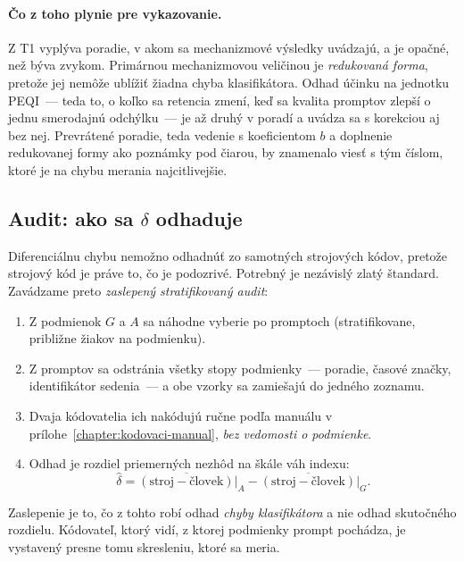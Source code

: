 \paragraph{Čo z toho plynie pre vykazovanie.} Z T1 vyplýva poradie, v akom sa mechanizmové výsledky uvádzajú, a je opačné, než býva zvykom. Primárnou mechanizmovou veličinou je \emph{redukovaná forma}, pretože jej nemôže ublížiť žiadna chyba klasifikátora. Odhad účinku na jednotku PEQI~--- teda to, o koľko sa retencia zmení, keď sa kvalita promptov zlepší o jednu smerodajnú odchýlku~--- je až druhý v poradí a uvádza sa s korekciou aj bez nej. Prevrátené poradie, teda vedenie s koeficientom $b$ a doplnenie redukovanej formy ako poznámky pod čiarou, by znamenalo viesť s tým číslom, ktoré je na chybu merania najcitlivejšie.

\subsection{Audit: ako sa \texorpdfstring{$\delta$}{delta} odhaduje}
\label{sec:audit}

Diferenciálnu chybu nemožno odhadnúť zo samotných strojových kódov, pretože strojový kód je práve to, čo je podozrivé. Potrebný je nezávislý zlatý štandard. Zavádzame preto \emph{zaslepený stratifikovaný audit}:

\begin{enumerate}[nosep]
    \item Z podmienok $G$ a $A$ sa náhodne vyberie po \audN{} promptoch (stratifikovane, približne \audPupils{} žiakov na podmienku).
    \item Z promptov sa odstránia všetky stopy podmienky~--- poradie, časové značky, identifikátor sedenia~--- a obe vzorky sa zamiešajú do jedného zoznamu.
    \item Dvaja kódovatelia ich nakódujú ručne podľa manuálu v prílohe~\ref{chapter:kodovaci-manual}, \emph{bez vedomosti o podmienke}.
    \item Odhad je rozdiel priemerných nezhôd na škále váh indexu:
    \begin{equation}
        \hat\delta = \overline{(\text{stroj} - \text{človek})}\big|_{A} - \overline{(\text{stroj} - \text{človek})}\big|_{G}.
    \end{equation}
\end{enumerate}

Zaslepenie je to, čo z tohto robí odhad \emph{chyby klasifikátora} a nie odhad skutočného rozdielu. Kódovateľ, ktorý vidí, z ktorej podmienky prompt pochádza, je vystavený presne tomu skresleniu, ktoré sa meria.

